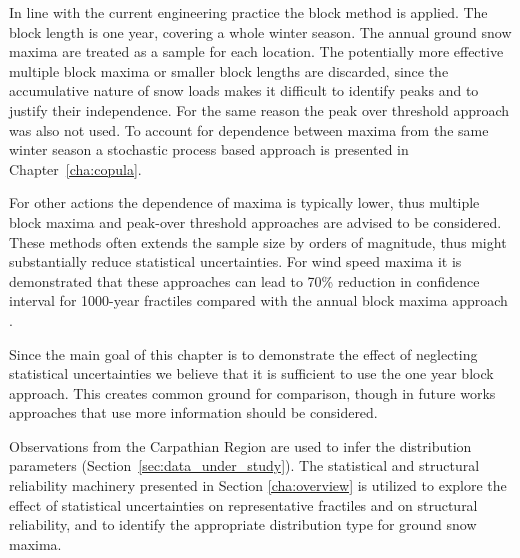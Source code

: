 In line with the current engineering practice the block method \citep{Coles2001} is applied. The block length is one year, covering a whole winter season. The annual ground snow maxima are treated as a sample for each location. The potentially more effective multiple block maxima or smaller block lengths are discarded, since the accumulative nature of snow loads makes it difficult to identify peaks and to justify their independence. For the same reason the peak over threshold approach \citep{Reiss2007} was also not used. To account for dependence between maxima from the same winter season a stochastic process based approach is presented in Chapter~\ref{cha:copula}.

For other actions the dependence of maxima is typically lower, thus multiple block maxima and peak-over threshold approaches are advised to be considered. These methods often extends the sample size by orders of magnitude, thus might substantially reduce statistical uncertainties. For wind speed maxima it is demonstrated that these approaches can lead to 70\% reduction in confidence interval for 1000-year fractiles compared with the annual block maxima approach \citep{RozsasREC2016wind}.

Since the main goal of this chapter is to demonstrate the effect of neglecting statistical uncertainties we believe that it is sufficient to use the one year block approach. This creates common ground for comparison, though in future works approaches that use more information should be considered.

Observations from the Carpathian Region are used to infer the distribution parameters (Section~\ref{sec:data_under_study}). The statistical and structural reliability machinery presented in Section \ref{cha:overview} is utilized to explore the effect of statistical uncertainties on representative fractiles and on structural reliability, and to identify the appropriate distribution type for ground snow maxima.


